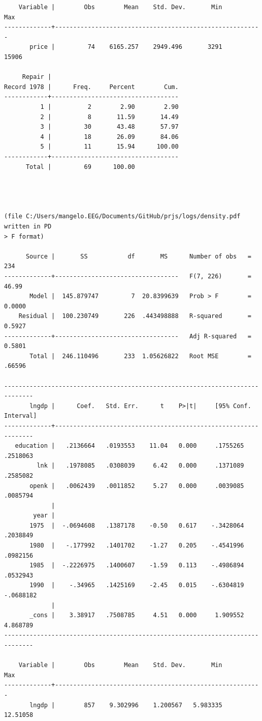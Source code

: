 \documentclass[
  12pt,
]{article}
\begin{document}
\begin{verbatim}
    Variable |        Obs        Mean    Std. Dev.       Min        Max
-------------+---------------------------------------------------------
       price |         74    6165.257    2949.496       3291      15906

     Repair |
Record 1978 |      Freq.     Percent        Cum.
------------+-----------------------------------
          1 |          2        2.90        2.90
          2 |          8       11.59       14.49
          3 |         30       43.48       57.97
          4 |         18       26.09       84.06
          5 |         11       15.94      100.00
------------+-----------------------------------
      Total |         69      100.00




(file C:/Users/mangelo.EEG/Documents/GitHub/prjs/logs/density.pdf written in PD
> F format)

      Source |       SS           df       MS      Number of obs   =       234
-------------+----------------------------------   F(7, 226)       =     46.99
       Model |  145.879747         7  20.8399639   Prob > F        =    0.0000
    Residual |  100.230749       226  .443498888   R-squared       =    0.5927
-------------+----------------------------------   Adj R-squared   =    0.5801
       Total |  246.110496       233  1.05626822   Root MSE        =    .66596

------------------------------------------------------------------------------
       lngdp |      Coef.   Std. Err.      t    P>|t|     [95% Conf. Interval]
-------------+----------------------------------------------------------------
   education |   .2136664   .0193553    11.04   0.000     .1755265    .2518063
         lnk |   .1978085   .0308039     6.42   0.000     .1371089    .2585082
       openk |   .0062439   .0011852     5.27   0.000     .0039085    .0085794
             |
        year |
       1975  |  -.0694608   .1387178    -0.50   0.617    -.3428064    .2038849
       1980  |   -.177992   .1401702    -1.27   0.205    -.4541996    .0982156
       1985  |  -.2226975   .1400607    -1.59   0.113    -.4986894    .0532943
       1990  |    -.34965   .1425169    -2.45   0.015    -.6304819   -.0688182
             |
       _cons |    3.38917   .7508785     4.51   0.000     1.909552    4.868789
------------------------------------------------------------------------------

    Variable |        Obs        Mean    Std. Dev.       Min        Max
-------------+---------------------------------------------------------
       lngdp |        857    9.302996    1.200567   5.983335   12.51058
\end{verbatim}
\end{document}
